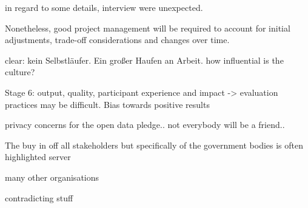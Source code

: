 in regard to some details, interview were unexpected. 

Nonetheless, good project management will be required to account for initial adjustments, trade-off considerations and changes over time. 

clear: kein Selbstläufer. Ein großer Haufen an Arbeit.
how influential is the culture?

Stage 6:
output, quality, participant experience and impact
-> evaluation practices may be difficult. Bias towards positive results

privacy concerns for the open data pledge.. not everybody will be a friend..

The buy in off all stakeholders but specifically of the government bodies is often highlighted 
server

many other organisations

contradicting stuff


